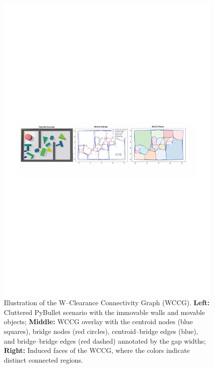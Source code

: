 \begin{figure}[t!]
  \centering
  \includegraphics[width=\linewidth]{figures/wccg.pdf}
  \vspace{-0.2in}
  \caption{Illustration of the W--Clearance Connectivity Graph (WCCG).
\textbf{Left:} Cluttered PyBullet scenario with the immovable walls and movable objects;
\textbf{Middle:} WCCG overlay with the centroid nodes (blue squares), bridge nodes
(red circles), centroid--bridge edges (blue), and bridge--bridge edges (red dashed)
annotated by the gap widths;
\textbf{Right:} Induced faces of the WCCG, where the colors indicate distinct connected
regions.}
  \label{fig:wccg}
  \vspace{-0.2in}
\end{figure}

